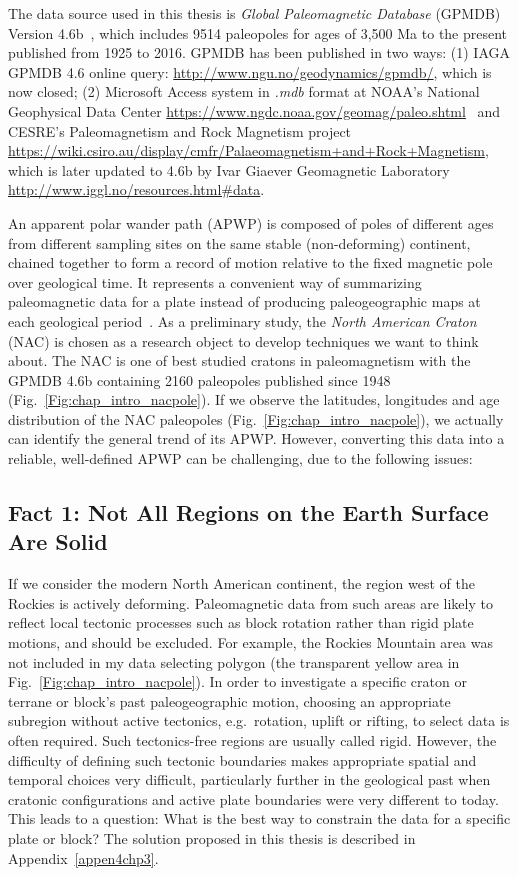 The data source used in this thesis is \emph{Global Paleomagnetic
Database} (GPMDB) Version 4.6b~\cite[updated in 2016 by the Ivar Giaever
Geomagnetic Laboratory team, in collaboration with Pisarevsky]{M96,P05}, which
includes 9514 paleopoles for ages of 3,500 Ma to the present published from 1925
to 2016. GPMDB has been published in two ways: (1) IAGA GPMDB 4.6 online query:
\url{http://www.ngu.no/geodynamics/gpmdb/}, which is now closed; (2) Microsoft
Access system in \emph{.mdb} format at NOAA's National Geophysical Data Center
\url{https://www.ngdc.noaa.gov/geomag/paleo.shtml}~\citep{P03}
and CESRE's Paleomagnetism and Rock Magnetism project
\url{https://wiki.csiro.au/display/cmfr/Palaeomagnetism+and+Rock+Magnetism},
which is later updated to 4.6b by Ivar Giaever Geomagnetic Laboratory
\url{http://www.iggl.no/resources.html\#data}.

An apparent polar wander path (APWP) is composed of poles of different ages
from different sampling sites on the same stable (non-deforming) continent,
chained together to form a record of motion relative to the fixed magnetic pole
over geological time. It represents a convenient way of summarizing
paleomagnetic data for a plate instead of producing paleogeographic maps at
each geological period~\citep{T08}. As a preliminary study, the \emph{North
American Craton} (NAC) is chosen as a research object to develop techniques we
want to think about. The NAC is one of best studied cratons in paleomagnetism
with the GPMDB 4.6b containing 2160 paleopoles published since 1948
(Fig.~\ref{Fig:chap_intro_nacpole}). If we observe the latitudes, longitudes and
age distribution of the NAC paleopoles (Fig.~\ref{Fig:chap_intro_nacpole}), we
actually can identify the general trend of its APWP\@. However, converting this
data into a reliable, well-defined APWP can be challenging, due to the following
issues:

\subsection{Fact 1: Not All Regions on the Earth Surface Are
Solid}\label{sec:f1}

If we consider the modern North American continent, the region west of the
Rockies is actively deforming. Paleomagnetic data from such areas are likely to
reflect local tectonic processes such as block rotation rather than rigid plate
motions, and should be excluded. For example, the Rockies Mountain area was not
included in my data selecting polygon (the transparent yellow area in
Fig.~\ref{Fig:chap_intro_nacpole}). In order to investigate a specific craton or
terrane or block's past paleogeographic motion, choosing an appropriate
subregion without active tectonics, e.g.\ rotation, uplift or rifting, to select
data is often required. Such tectonics-free regions are usually called rigid.
However, the difficulty of defining such tectonic boundaries makes appropriate
spatial and temporal choices very difficult, particularly further in the
geological past when cratonic configurations and active plate boundaries were
very different to today. This leads to a question: What is the best way to
constrain the data for a specific plate or block? The solution proposed in this
thesis is described in Appendix~\ref{appen4chp3}.

